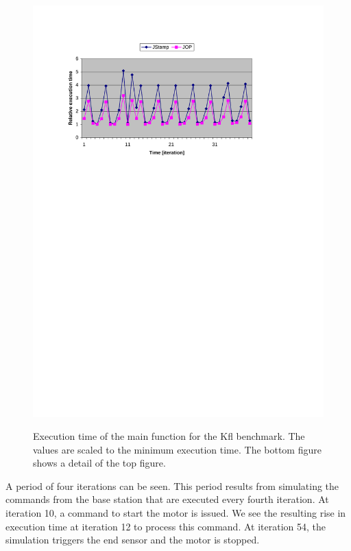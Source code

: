 \begin{figure}
    \\
    \vspace{0.5cm}
    \includegraphics[width=\excelwidth]{results/results_kfl_exe_detail}
    \caption{Execution time of the main function for the Kfl benchmark.
    The values are scaled to the minimum execution time. The bottom
    figure shows a detail of the top figure.
    }
    \label{fig:results:kfl:exe}
\end{figure}


A period of four iterations can be seen. This period results from
simulating the commands from the base station that are executed
every fourth iteration. At iteration 10, a command to start the
motor is issued. We see the resulting rise in execution time at
iteration 12 to process this command. At iteration 54, the
simulation triggers the end sensor and the motor is stopped.

